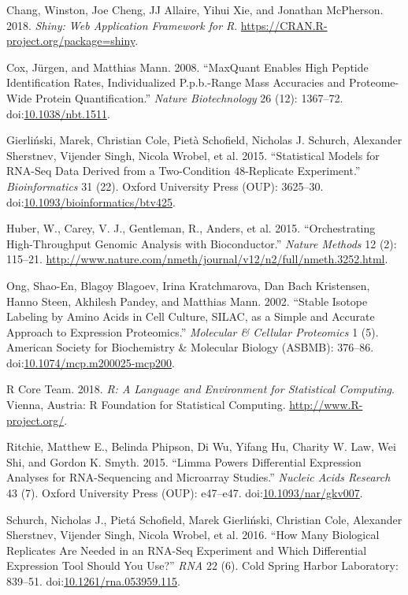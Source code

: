 \documentclass[]{article}
\begin{document}
\hypertarget{refs}{}
\hypertarget{ref-shiny}{}
Chang, Winston, Joe Cheng, JJ Allaire, Yihui Xie, and Jonathan
McPherson. 2018. \emph{Shiny: Web Application Framework for R}.
\url{https://CRAN.R-project.org/package=shiny}.

\hypertarget{ref-coxmann2008}{}
Cox, Jürgen, and Matthias Mann. 2008. ``MaxQuant Enables High Peptide
Identification Rates, Individualized P.p.b.-Range Mass Accuracies and
Proteome-Wide Protein Quantification.'' \emph{Nature Biotechnology} 26
(12): 1367--72.
doi:\href{https://doi.org/10.1038/nbt.1511}{10.1038/nbt.1511}.

\hypertarget{ref-gierlinski2015}{}
Gierliński, Marek, Christian Cole, Pietà Schofield, Nicholas J. Schurch,
Alexander Sherstnev, Vijender Singh, Nicola Wrobel, et al. 2015.
``Statistical Models for RNA-Seq Data Derived from a Two-Condition
48-Replicate Experiment.'' \emph{Bioinformatics} 31 (22). Oxford
University Press (OUP): 3625--30.
doi:\href{https://doi.org/10.1093/bioinformatics/btv425}{10.1093/bioinformatics/btv425}.

\hypertarget{ref-bioconductor2015}{}
Huber, W., Carey, V. J., Gentleman, R., Anders, et al. 2015.
``Orchestrating High-Throughput Genomic Analysis with Bioconductor.''
\emph{Nature Methods} 12 (2): 115--21.
\url{http://www.nature.com/nmeth/journal/v12/n2/full/nmeth.3252.html}.

\hypertarget{ref-ong2002}{}
Ong, Shao-En, Blagoy Blagoev, Irina Kratchmarova, Dan Bach Kristensen,
Hanno Steen, Akhilesh Pandey, and Matthias Mann. 2002. ``Stable Isotope
Labeling by Amino Acids in Cell Culture, SILAC, as a Simple and Accurate
Approach to Expression Proteomics.'' \emph{Molecular \& Cellular
Proteomics} 1 (5). American Society for Biochemistry \& Molecular
Biology (ASBMB): 376--86.
doi:\href{https://doi.org/10.1074/mcp.m200025-mcp200}{10.1074/mcp.m200025-mcp200}.

\hypertarget{ref-R2018}{}
R Core Team. 2018. \emph{R: A Language and Environment for Statistical
Computing}. Vienna, Austria: R Foundation for Statistical Computing.
\url{http://www.R-project.org/}.

\hypertarget{ref-ritchie2015}{}
Ritchie, Matthew E., Belinda Phipson, Di Wu, Yifang Hu, Charity W. Law,
Wei Shi, and Gordon K. Smyth. 2015. ``Limma Powers Differential
Expression Analyses for RNA-Sequencing and Microarray Studies.''
\emph{Nucleic Acids Research} 43 (7). Oxford University Press (OUP):
e47--e47.
doi:\href{https://doi.org/10.1093/nar/gkv007}{10.1093/nar/gkv007}.

\hypertarget{ref-schurch2016}{}
Schurch, Nicholas J., Pietá Schofield, Marek Gierliński, Christian Cole,
Alexander Sherstnev, Vijender Singh, Nicola Wrobel, et al. 2016. ``How
Many Biological Replicates Are Needed in an RNA-Seq Experiment and Which
Differential Expression Tool Should You Use?'' \emph{RNA} 22 (6). Cold
Spring Harbor Laboratory: 839--51.
doi:\href{https://doi.org/10.1261/rna.053959.115}{10.1261/rna.053959.115}.
\end{document}
